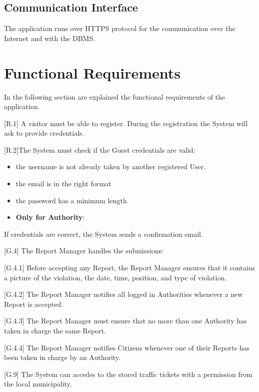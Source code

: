 \documentclass{report}
\begin{document}
\subsection{Communication Interface}
The application runs over HTTPS protocol for the communication over the Internet and with the DBMS.
\section{Functional Requirements}
In the following section are explained the functional requirements of the application.
\begin{itemize}
	\item {[R.1]} A visitor must be able to register. During the registration the System will ask to provide credentials.
	\item {[R.2]}The System must check if the Guest credentials are valid:
		\begin{itemize}
			\item the username is not already taken by another registered User.
			\item the email is in the right format
			\item the password has a minimum length
			\item \textbf{Only for Authority}: 
		\end{itemize}
		If credentials are correct, the System sends a confirmation email.
	\item {[G.4]} The Report Manager handles the submissions:
    {\setlength\itemindent{25pt} \item {[G.4.1]} Before accepting any Report, the Report Manager ensures that it contains a picture of the violation, the date, time, position, and type of violation.}
    {\setlength\itemindent{25pt} \item {[G.4.2]} The Report Manager notifies all logged in Authorities whenever a new Report is accepted.}
    {\setlength\itemindent{25pt} \item {[G.4.3]} The Report Manager must ensure that no more than one Authority has taken in charge the same Report.}
    {\setlength\itemindent{25pt} \item {[G.4.4]} The Report Manager notifies Citizens whenever one of their Reports has been taken in charge by an Authority.}
	\item {[G.9]} The System can accedes to the stored traffic tickets with a permission from the local municipality.
\end{itemize}
\end{document}

